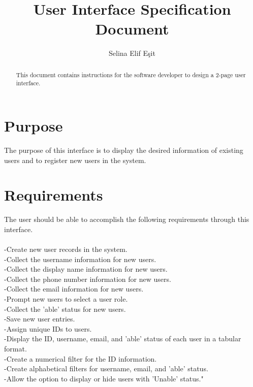 \documentclass{article}
\title{User Interface Specification Document}
\author{Selina Elif Eşit}
\begin{document}
\maketitle

\begin{abstract}
This document contains instructions for the software developer to design a 2-page user interface.
\end{abstract}

\section{Purpose}
The purpose of this interface is to display the desired information of existing users and to register new users in the system.


\section{Requirements}
The user should be able to accomplish the following requirements through this interface.\\
\\
-Create new user records in the system.\\
-Collect the username information for new users.\\ 
-Collect the display name information for new users.\\ 
-Collect the phone number information for new users.\\ 
-Collect the email information for new users.\\ 
-Prompt new users to select a user role.\\ 
-Collect the 'able' status for new users.\\ 
-Save new user entries.\\ 
-Assign unique IDs to users.\\ 
-Display the ID, username, email, and 'able' status of  each user in a tabular format.\\ 
-Create a numerical filter for the ID information.\\ 
-Create alphabetical filters for username, email, and 'able' status.\\ 
-Allow the option to display or hide users with 'Unable' status."
\end{document}
